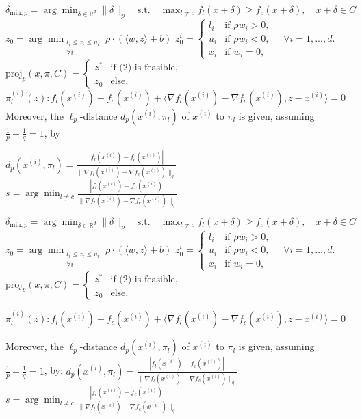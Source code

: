 $\delta_{\text{min},p} = \arg \min_{\delta \in \mathbb{R}^d} \|\delta\|_p \quad \text{s.t.} \quad \max_{l \neq c} f_l(x + \delta) \geq f_c(x + \delta), \quad x + \delta \in C$
$z_0 = \arg \min_{\substack{l_i \leq z_i \leq u_i \\ \forall i}} \rho \cdot (\langle w, z \rangle + b)$
$z_0^i = \begin{cases} 
l_i & \text{if } \rho w_i > 0, \\
u_i & \text{if } \rho w_i < 0, \\
x_i & \text{if } w_i = 0,
\end{cases}
\quad \forall i = 1, ..., d.
$
$\text{proj}_p(x, \pi, C) = \begin{cases} 
z^* & \text{if (2) is feasible}, \\
z_0 & \text{else}.
\end{cases}$
$\pi_l^{(i)}(z) : f_l(x^{(i)}) - f_c(x^{(i)}) + \langle \nabla f_l(x^{(i)}) - \nabla f_c(x^{(i)}), z - x^{(i)} \rangle = 0$
Moreover, the $\ell_p$-distance $d_p(x^{(i)}, \pi_l)$ of $x^{(i)}$ to $\pi_l$ is given, assuming $\frac{1}{p} + \frac{1}{q} = 1$, by

$d_p(x^{(i)}, \pi_l) = \frac{|f_l(x^{(i)}) - f_c(x^{(i)})|}{\|\nabla f_l(x^{(i)}) - \nabla f_c(x^{(i)})\|_q}$
$s = \arg \min_{l \neq c} \frac{|f_l(x^{(i)}) - f_c(x^{(i)})|}{\|\nabla f_l(x^{(i)}) - \nabla f_c(x^{(i)})\|_q}$

$\delta_{\text{min},p} = \arg \min_{\delta \in \mathbb{R}^d} \|\delta\|_p \quad \text{s.t.} \quad \max_{l \neq c} f_l(x + \delta) \geq f_c(x + \delta), \quad x + \delta \in C$
$z_0 = \arg \min_{\substack{l_i \leq z_i \leq u_i \\ \forall i}} \rho \cdot (\langle w, z \rangle + b)$
$z_0^i = \begin{cases} 
l_i & \text{if } \rho w_i > 0, \\
u_i & \text{if } \rho w_i < 0, \\
x_i & \text{if } w_i = 0,
\end{cases}
\quad \forall i = 1, \dots, d.$
$\text{proj}_p(x, \pi, C) = \begin{cases} 
z^* & \text{if (2) is feasible}, \\
z_0 & \text{else}.
\end{cases}$

$\pi_l^{(i)}(z) : f_l(x^{(i)}) - f_c(x^{(i)}) + \langle \nabla f_l(x^{(i)}) - \nabla f_c(x^{(i)}), z - x^{(i)} \rangle = 0$

Moreover, the $\ell_p$-distance $d_p(x^{(i)}, \pi_l)$ of $x^{(i)}$ to $\pi_l$ is given, assuming $\frac{1}{p} + \frac{1}{q} = 1$, by:
$d_p(x^{(i)}, \pi_l) = \frac{|f_l(x^{(i)}) - f_c(x^{(i)})|}{\|\nabla f_l(x^{(i)}) - \nabla f_c(x^{(i)})\|_q}$
$s = \arg \min_{l \neq c} \frac{|f_l(x^{(i)}) - f_c(x^{(i)})|}{\|\nabla f_l(x^{(i)}) - \nabla f_c(x^{(i)})\|_q}$


